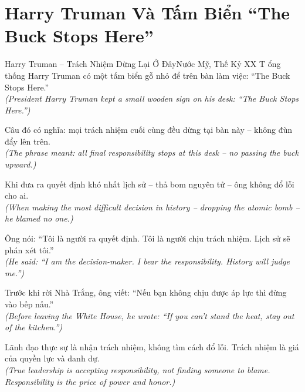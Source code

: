 \section{Harry Truman Và Tấm Biển ``The Buck Stops Here''}
\begin{truyen}{Harry Truman -- Trách Nhiệm Dừng Lại Ở Đây}{Nước Mỹ, Thế Kỷ XX}
T ổng thống Harry Truman có một tấm biển gỗ nhỏ để trên bàn làm việc: ``The Buck Stops Here.''\\
\textit{(President Harry Truman kept a small wooden sign on his desk: ``The Buck Stops Here.'')}

Câu đó có nghĩa: mọi trách nhiệm cuối cùng đều dừng tại bàn này -- không đùn đẩy lên trên.\\
\textit{(The phrase meant: all final responsibility stops at this desk -- no passing the buck upward.)}

Khi đưa ra quyết định khó nhất lịch sử -- thả bom nguyên tử -- ông không đổ lỗi cho ai.\\
\textit{(When making the most difficult decision in history -- dropping the atomic bomb -- he blamed no one.)}

Ông nói: ``Tôi là người ra quyết định. Tôi là người chịu trách nhiệm. Lịch sử sẽ phán xét tôi.''\\
\textit{(He said: ``I am the decision-maker. I bear the responsibility. History will judge me.'')}

Trước khi rời Nhà Trắng, ông viết: ``Nếu bạn không chịu được áp lực thì đừng vào bếp nấu.''\\
\textit{(Before leaving the White House, he wrote: ``If you can't stand the heat, stay out of the kitchen.'')}

\end{truyen}
\begin{baihoc}
  Lãnh đạo thực sự là nhận trách nhiệm, không tìm cách đổ lỗi. Trách nhiệm là giá của quyền lực và danh dự.\\
  \textit{(True leadership is accepting responsibility, not finding someone to blame. Responsibility is the price of power and honor.)}
\end{baihoc}

